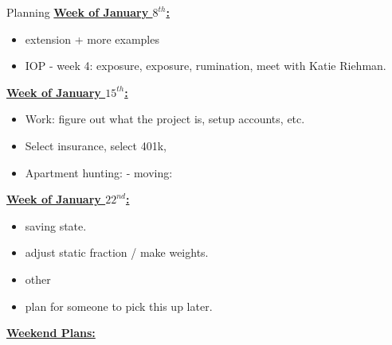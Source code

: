 \documentclass[serif, mathserif, final]{beamer}
\newcommand{\te}[1]{\textit{TimeEst:}\textit{#1}}
\newcommand{\dl}[1]{\textit{Deadline:}\textit{#1}}
\begin{document}
\begin{frame}
\begin{columns}
\begin{column}{0.5\textwidth}
\begin{block}{Planning}
\underline{{\bf Week of January $8^{th}$:}} 
\begin{itemize} 
\small \item \small extension + more examples
\item \small IOP - week 4: exposure, exposure, rumination,   meet with
  Katie Riehman.
\end{itemize} 

\underline{{\bf Week of January $15^{th}$:}}
\begin{itemize} 
\small \item \small Work: figure out what the project is, setup accounts, etc.
\item \small Select insurance, select 401k,
\item \small Apartment hunting: - moving:
\end{itemize}

\underline{{\bf Week of January $22^{nd}$:}}
\begin{itemize}
\small \item \small saving state.
\item \small adjust static fraction / make weights.
\item \small other
\item \small plan for someone to pick this up later.
\end{itemize}

{\underline{\textbf{Weekend Plans:}}}
\end{block}

\end{column} %
\end{columns}

\end{frame}
\end{document}
